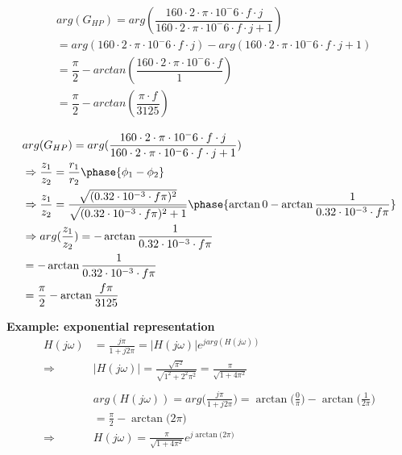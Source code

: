 \begin{align*}
    &arg(G_{HP})=arg(\dfrac{160 \cdot 2 \cdot \pi \cdot 10^-6 \cdot f \cdot j}{160 \cdot 2 \cdot \pi \cdot 10^-6 \cdot f \cdot j + 1}) \\
    &= arg(160 \cdot 2 \cdot \pi \cdot 10^-6 \cdot f \cdot j) - arg(160 \cdot 2 \cdot \pi \cdot 10^-6 \cdot f \cdot j + 1)\\
    &=\dfrac{\pi}{2} - arctan(\dfrac{160 \cdot 2 \cdot \pi \cdot 10^-6 \cdot f}{1})\\
    &=\dfrac{\pi}{2} - arctan(\dfrac{\pi \cdot f}{3125})
\end{align*}

\begin{align*}
    &arg(G_{HP})=arg(\dfrac{160 \cdot 2 \cdot \pi \cdot 10^-6 \cdot f \cdot j}{160 \cdot 2 \cdot \pi \cdot 10^-6 \cdot f \cdot j + 1}) \\
    &\Rightarrow \dfrac{z_1}{z_2} = \frac{r_1}{r_2}\phase{\phi_1-\phi_2}  \\
    &\Rightarrow \dfrac{z_1}{z_2} = \frac{\sqrt{(0.32 \cdot 10^{-3} \cdot f\pi)^2}}{\sqrt{(0.32 \cdot 10^{-3} \cdot f\pi)^2 + 1}}\phase{\arctan{0}-\arctan{\frac{1}{0.32 \cdot 10^{-3} \cdot f\pi}}}  \\
    &\Rightarrow arg(\dfrac{z_1}{z_2}) = -\arctan{\frac{1}{0.32 \cdot 10^{-3} \cdot f\pi}}  \\
    &= -\arctan{\frac{1}{0.32 \cdot 10^{-3} \cdot f\pi}}  \\
    &= \frac{\pi}{2}-\arctan{\frac{f\pi}{3125}}  \\
\end{align*}


\textbf{Example: exponential representation}
\begin{align*}
    H(j\omega) &= \frac{j\pi}{1+j2\pi} = |H(j\omega)| e^{j arg(H(j\omega))} \\
    \Rightarrow &|H(j\omega)| = \frac{\sqrt{\pi^2}}{\sqrt{1^2+2^2\pi^2}}
    = \frac{\pi}{\sqrt{1+4\pi^2}} \\
    &\\
    &arg(H(j\omega)) = arg\Big(\frac{j\pi}{1+j2\pi}\Big)= \arctan{\Big(\frac{0}{\pi}\Big)}-\arctan{\Big(\frac{1}{2\pi}\Big)} \\
    &= \frac{\pi}{2} -\arctan{\Big(2\pi\Big)} \\
    \Rightarrow &H(j\omega) = \frac{\pi}{\sqrt{1+4\pi^2}}e^{j\arctan{\Big(2\pi\Big)}} \\
\end{align*}

